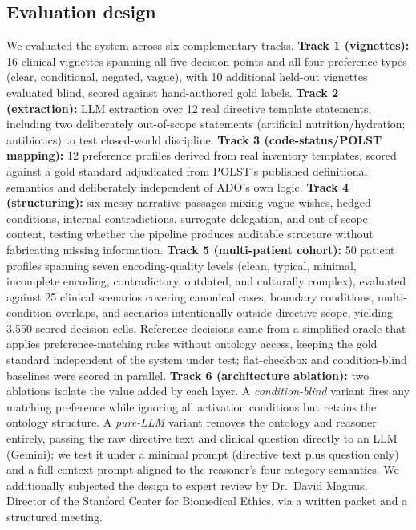 \documentclass[10pt]{article}
\begin{document}
\subsection{Evaluation design}
We evaluated the system across six complementary tracks. \textbf{Track 1 (vignettes):} 16 clinical vignettes spanning all five decision points and all four preference types (clear, conditional, negated, vague), with 10 additional held-out vignettes evaluated blind, scored against hand-authored gold labels. \textbf{Track 2 (extraction):} LLM extraction over 12 real directive template statements, including two deliberately out-of-scope statements (artificial nutrition/hydration; antibiotics) to test closed-world discipline. \textbf{Track 3 (code-status/POLST mapping):} 12 preference profiles derived from real inventory templates, scored against a gold standard adjudicated from POLST's published definitional semantics and deliberately independent of ADO's own logic. \textbf{Track 4 (structuring):} six messy narrative passages mixing vague wishes, hedged conditions, internal contradictions, surrogate delegation, and out-of-scope content, testing whether the pipeline produces auditable structure without fabricating missing information. \textbf{Track 5 (multi-patient cohort):} 50 patient profiles spanning seven encoding-quality levels (clean, typical, minimal, incomplete encoding, contradictory, outdated, and culturally complex), evaluated against 25 clinical scenarios covering canonical cases, boundary conditions, multi-condition overlaps, and scenarios intentionally outside directive scope, yielding 3{,}550 scored decision cells. Reference decisions came from a simplified oracle that applies preference-matching rules without ontology access, keeping the gold standard independent of the system under test; flat-checkbox and condition-blind baselines were scored in parallel. \textbf{Track 6 (architecture ablation):} two ablations isolate the value added by each layer. A \emph{condition-blind} variant fires any matching preference while ignoring all activation conditions but retains the ontology structure. A \emph{pure-LLM} variant removes the ontology and reasoner entirely, passing the raw directive text and clinical question directly to an LLM (Gemini); we test it under a minimal prompt (directive text plus question only) and a full-context prompt aligned to the reasoner's four-category semantics. We additionally subjected the design to expert review by Dr.\ David Magnus, Director of the Stanford Center for Biomedical Ethics, via a written packet and a structured meeting.
\end{document}
